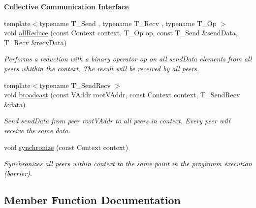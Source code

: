\begin{Indent}{\bf Collective Communication Interface}
\begin{DoxyCompactItemize}
{\footnotesize template$<$typename T\+\_\+\+Send , typename T\+\_\+\+Recv , typename T\+\_\+\+Op $>$ }\\void \hyperlink{structgraybat_1_1communicationPolicy_1_1Base_ac77038454619b683f006ba149aea2dcb}{all\+Reduce} (const Context context, T\+\_\+\+Op op, const T\+\_\+\+Send \&send\+Data, T\+\_\+\+Recv \&recv\+Data)
\begin{DoxyCompactList}\small\item\em Performs a reduction with a binary operator {\itshape op} on all {\itshape send\+Data} elements from all peers whithin the {\itshape context}. The result will be received by all peers. \end{DoxyCompactList}\item 
{\footnotesize template$<$typename T\+\_\+\+Send\+Recv $>$ }\\void \hyperlink{structgraybat_1_1communicationPolicy_1_1Base_a431ed56b3d5ade805200b565ce98daa0}{broadcast} (const V\+Addr root\+V\+Addr, const Context context, T\+\_\+\+Send\+Recv \&data)
\begin{DoxyCompactList}\small\item\em Send {\itshape send\+Data} from peer {\itshape root\+V\+Addr} to all peers in {\itshape context}. Every peer will receive the same data. \end{DoxyCompactList}\item 
\hypertarget{structgraybat_1_1communicationPolicy_1_1Base_abc4e72365c6ad134ba6e31abd8fa2163}{}void \hyperlink{structgraybat_1_1communicationPolicy_1_1Base_abc4e72365c6ad134ba6e31abd8fa2163}{synchronize} (const Context context)\label{structgraybat_1_1communicationPolicy_1_1Base_abc4e72365c6ad134ba6e31abd8fa2163}

\begin{DoxyCompactList}\small\item\em Synchronizes all peers within {\itshape context} to the same point in the programm execution (barrier). \end{DoxyCompactList}\end{DoxyCompactItemize}
\end{Indent}


\subsection{Member Function Documentation}
\hypertarget{structgraybat_1_1communicationPolicy_1_1Base_a1b409ea49d7aba2dee0c83e28dda1b65}{}

